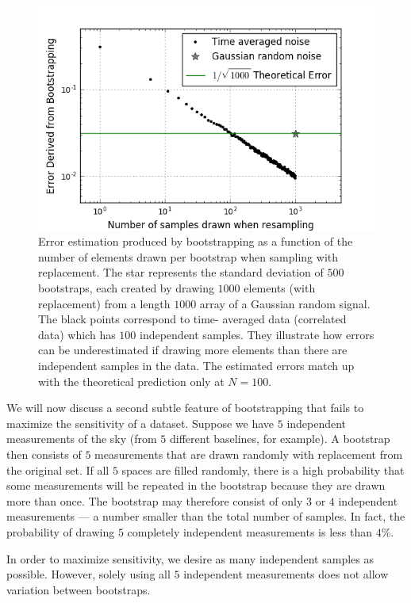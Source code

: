 \documentclass[preprint2,numberedappendix,tighten]{aastex6}  %
\begin{document}
\begin{figure}
	\centering
	\includegraphics[trim={0.3cm 0.3cm 0.3cm 0.3cm},width=\columnwidth]{plots/toy_error1.png}
	\caption{Error estimation produced by bootstrapping as a function of the number of elements drawn per bootstrap when 
sampling with replacement. The star represents the standard deviation of $500$ bootstraps, each created by drawing $1000$ 
elements (with replacement) from a length $1000$ array of a Gaussian random signal. The black points correspond to time-
averaged data (correlated data) which has $100$ independent samples. They illustrate how errors can be underestimated if 
drawing more elements than there are independent samples in the data. The estimated errors match up with the theoretical 
prediction only at $N=100$.}
	\label{fig:toy_error1}
\end{figure}

We will now discuss a second subtle feature of bootstrapping that fails to maximize the sensitivity of a dataset. Suppose we 
have $5$ independent measurements of the sky (from $5$ different baselines, for example). A bootstrap then consists of $5$ 
measurements that are drawn randomly with replacement from the original set. If all $5$ spaces are filled randomly, there is a 
high probability that some measurements will be repeated in the bootstrap because they are drawn more than once. The 
bootstrap may therefore consist of only $3$ or $4$ independent measurements --- a number smaller than the total number of 
samples. In fact, the probability of drawing $5$ completely independent measurements is less than $4\%$.

In order to maximize sensitivity, we desire as many independent samples as possible. However, solely using all $5$ 
independent measurements does not allow variation between bootstraps. 
\end{document}
